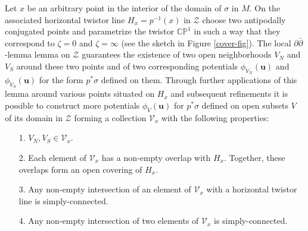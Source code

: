 \documentclass[11pt]{amsart}
\theoremstyle{remark}
\theoremstyle{remark}
\theoremstyle{definition}
\theoremstyle{definition}
\theoremstyle{definition}
\newcommand{\0}{{\scriptstyle 0'}} %
\newcommand{\1}{{\scriptstyle 1'}}
\newcommand{\pt}{\hspace{1pt}} %
\newcommand{\hp}{\hspace{0.5pt}} %
\begin{document}
Let $x$ be an arbitrary point in the interior of the domain of $\sigma$ in $M$. On the associated horizontal twistor line $H_x = p^{-1}(x)$ in $\mathcal{Z}$ choose two antipodally conjugated points and parametrize the twistor $\mathbb{CP}^1$ in such a way that they correspond to $\zeta = 0$ and $\zeta = \infty$ (see the sketch in Figure \ref{cover-fig}). The local \mbox{$\partial\bar{\partial}$\pt-\hp lemma} lemma on $\mathcal{Z}$ guarantees the existence of two open neighborhoods $V_N$ and $V_S$ around these two points and of two corresponding potentials $\phi_{V_N}(\mathbf{u})$ and $\phi_{V_S}(\mathbf{u})$ for the form $p^*\sigma$ defined on them. Through further applications of this lemma around various points situated on $H_x$ and subsequent refinements it is possible to construct more potentials $\phi_V(\mathbf{u})$ for $p^*\sigma$ defined on open subsets $V$ of its domain in $\mathcal{Z}$ forming a collection $\mathscr{V}_x$ with the following properties: 
\begin{itemize}
\setlength{\itemsep}{1pt}

\item[1.] $V_N, V_S \in \mathscr{V}_x$.

\item[2.] Each element of $\mathscr{V}_x$ has a non-empty overlap with $H_x$. Together, these overlaps form an open covering of $H_x$.

\item[3.] Any non-empty intersection of an element of $\mathscr{V}_x$ with a horizontal twistor line is simply-connected. 

\item[4.] Any non-empty intersection of two elements of $\mathscr{V}_x$ is simply-connected. 

\end{itemize}
\end{document}

